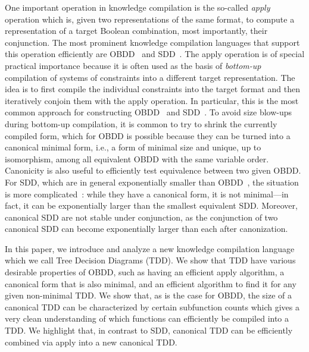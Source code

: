 \documentclass[a4paper,UKenglish,cleveref, autoref, thm-restate]{lipics-v2021}
\newcommand{\imartin}[1]{\todo[inline,color=yellow]{\color{violet}{{\bf Martín}: #1}}}
\begin{document}
One important operation in knowledge compilation is the so-called {\em apply} operation which is, given two representations of the same format, to compute a representation of a target Boolean combination, most importantly, their conjunction. The most prominent knowledge compilation languages that support this operation efficiently are OBDD~\cite{Bryant92} 
and SDD~\cite{Darwiche11}. The apply operation is of special practical importance because it is often used as the basis of \emph{bottom-up} compilation of systems of constraints into a different target representation. The idea is to first compile the individual constraints into the target format and then iteratively conjoin them with the apply operation. In particular, this is the most common approach for constructing OBDD~\cite{cudd} and SDD~\cite{Choi_Darwiche_2013}. To avoid size blow-ups during bottom-up compilation, it is common to try to shrink the currently compiled form, which for OBDD is possible because they can be turned into a canonical minimal form, i.e., a form of minimal size and unique, up to isomorphism, among all equivalent OBDD with the same variable order. Canonicity is also useful to efficiently test equivalence between two given OBDD. For SDD, which are in general exponentially smaller than OBDD~\cite{Bova16}, the situation is more complicated~\cite{van2015role}: while they have a canonical form, it is not minimal---in fact, it can be exponentially larger than the smallest equivalent SDD. 
Moreover, canonical SDD are not stable under conjunction, 
as the conjunction of two canonical SDD can become exponentially larger than each after canonization.

In this paper, we introduce and analyze a new knowledge compilation language which we call Tree Decision Diagrams (TDD). We show that TDD have various desirable properties of OBDD, such as having an efficient apply algorithm, a canonical form that is also minimal, and an efficient algorithm to find it for any given non-minimal TDD. We show that, as is the case for OBDD, the size of a canonical TDD can be characterized by certain subfunction counts which gives a very clean understanding of which functions can efficiently be compiled into a TDD. 
We highlight that, in contrast to SDD, canonical TDD can be efficiently combined via apply into a new canonical TDD.

\end{document}
